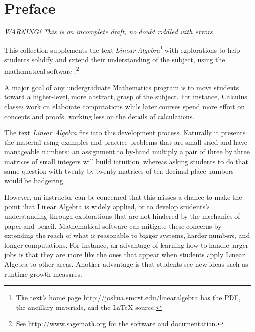 \chapter*{Preface}\pagestyle{preface}\thispagestyle{preface}
\setlength{\parskip}{.25ex}

\textit{WARNING! This is an incomplete draft,
no doubt riddled with errors.}
\smallskip

This collection supplements the text \nocite{Hefferon12}
\textit{Linear Algebra}\footnote{The text's home page 
\protect\url{http://joshua.smcvt.edu/linearalgebra} 
has the PDF, the ancillary materials, and the \protect\LaTeX{} source.}
with explorations to help students
solidify and extend their understanding of the subject, 
using the mathematical software \Sage{}.\footnote{See 
\url{http://www.sagemath.org} for the software and documentation.}

A major goal of any undergraduate Mathematics program is to move students 
toward a higher-level, more abstract, grasp of the subject.
For instance, Calculus classes work on elaborate computations
while later courses spend more effort on concepts and proofs, working
less on the details of calculations.  

The text \textit{Linear Algebra} fits into
this development process.
Naturally it presents the material 
using examples and practice problems
that are small-sized and have manageable numbers:~an 
assignment to by-hand multiply a pair of three by three matrices
of small integers will build intuition, whereas asking students to do that same 
question with twenty by twenty matrices
of ten decimal place numbers would be badgering. 

However, an instructor can be concerned that this misses a chance 
to make the point that Linear Algebra is widely applied,
or to develop students's understanding through explorations that are not 
hindered by the mechanics of paper and pencil. 
Mathematical software can mitigate these concerns by extending the reach of
what is reasonable 
to bigger systems, harder numbers, and longer computations.
For instance, an advantage of learning how to handle larger jobs is that 
they are more like the ones that appear when students apply Linear 
Algebra to other areas.
Another advantage is that students see new ideas such as 
runtime growth measures.

